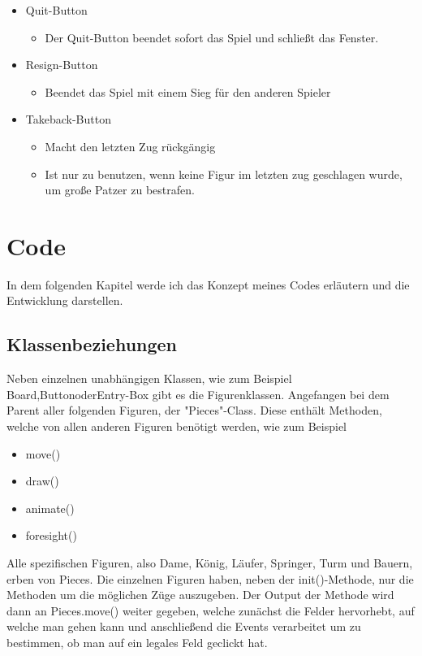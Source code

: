 \documentclass[a4paper, 10pt]{scrartcl}
\begin{document}
\begin{itemize}
        \item \glqq Quit\grqq-Button
        \begin{itemize}
                \item Der Quit-Button beendet sofort das Spiel und schließt das Fenster.
        \end{itemize}
        \item \glqq Resign\grqq-Button
        \begin{itemize}
                \item Beendet das Spiel mit einem Sieg für den anderen Spieler
        \end{itemize}
        \item \glqq Takeback\grqq-Button
        \begin{itemize}
                \item Macht den letzten Zug rückgängig
                \item Ist nur zu benutzen, wenn keine Figur im letzten zug geschlagen wurde, um große Patzer zu bestrafen.
        \end{itemize}
\end{itemize}



\section{Code}
In dem folgenden Kapitel werde ich das Konzept meines Codes erläutern und die Entwicklung darstellen. 

\subsection{Klassenbeziehungen}
Neben einzelnen unabhängigen Klassen, wie zum Beispiel
\glqq Board\grqq{},\glqq Button\grqq{}oder\glqq Entry-Box\grqq{}
gibt es die Figurenklassen. Angefangen bei dem Parent aller folgenden Figuren, der "Pieces"-Class.
Diese enthält Methoden, welche von allen anderen Figuren benötigt werden, wie zum Beispiel
\begin{itemize}
        \item move()
        \item draw()
        \item animate()
        \item foresight()
\end{itemize}
Alle spezifischen Figuren, also Dame, König, Läufer, Springer, Turm und Bauern, erben von Pieces.
Die einzelnen Figuren haben, neben der init()-Methode, nur die Methoden um die möglichen Züge auszugeben. 
Der Output der Methode wird dann an Pieces.move() weiter gegeben, welche zunächst die Felder hervorhebt, auf welche man gehen kann und anschließend
die Events verarbeitet um zu bestimmen, ob man auf ein legales Feld geclickt hat. 
\end{document}
